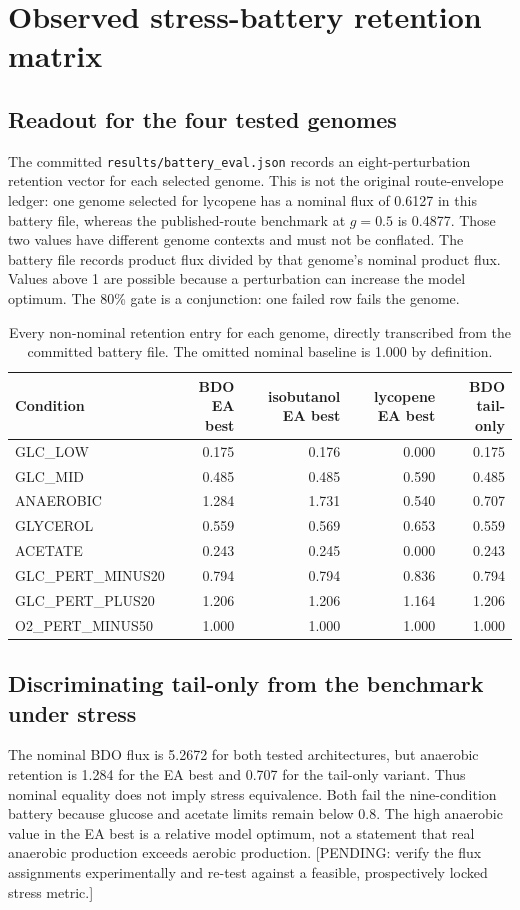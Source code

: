 \section{Observed stress-battery retention matrix}
\subsection{Readout for the four tested genomes}
The committed \texttt{results/battery\_eval.json} records an eight-perturbation retention vector for each selected genome. This is not the original route-envelope ledger: one genome selected for lycopene has a nominal flux of 0.6127 in this battery file, whereas the published-route benchmark at $g=0.5$ is 0.4877. Those two values have different genome contexts and must not be conflated. The battery file records product flux divided by that genome's nominal product flux. Values above 1 are possible because a perturbation can increase the model optimum. The 80\% gate is a conjunction: one failed row fails the genome.\begin{table}[!htbp]\centering\scriptsize\caption{Every non-nominal retention entry for each genome, directly transcribed from the committed battery file. The omitted nominal baseline is 1.000 by definition.}\begin{tabular}{lrrrr}\hline Condition & BDO EA best & isobutanol EA best & lycopene EA best & BDO tail-only \\\hline
GLC\_LOW & 0.175 & 0.176 & 0.000 & 0.175 \\
GLC\_MID & 0.485 & 0.485 & 0.590 & 0.485 \\
ANAEROBIC & 1.284 & 1.731 & 0.540 & 0.707 \\
GLYCEROL & 0.559 & 0.569 & 0.653 & 0.559 \\
ACETATE & 0.243 & 0.245 & 0.000 & 0.243 \\
GLC\_PERT\_MINUS20 & 0.794 & 0.794 & 0.836 & 0.794 \\
GLC\_PERT\_PLUS20 & 1.206 & 1.206 & 1.164 & 1.206 \\
O2\_PERT\_MINUS50 & 1.000 & 1.000 & 1.000 & 1.000 \\
\hline\end{tabular}\end{table}
\subsection{Discriminating tail-only from the benchmark under stress}
The nominal BDO flux is 5.2672 for both tested architectures, but anaerobic retention is 1.284 for the EA best and 0.707 for the tail-only variant. Thus nominal equality does not imply stress equivalence. Both fail the nine-condition battery because glucose and acetate limits remain below 0.8. The high anaerobic value in the EA best is a relative model optimum, not a statement that real anaerobic production exceeds aerobic production. [PENDING: verify the flux assignments experimentally and re-test against a feasible, prospectively locked stress metric.]

